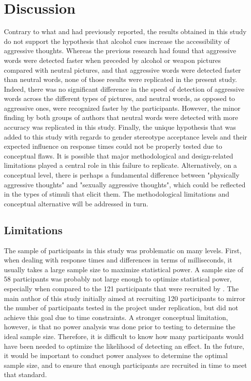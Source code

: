 \documentclass[serif, authordate, twocolumn, empirical]{jote-article}
\begin{document}
{}
\section*{Discussion} %
\label{sec:discussion}

Contrary to what \textcite{BartholowHeinz2006} and \textcite{SubraMullerBegueLBushmanDelmas2010} had previously reported, the results obtained in this study do not support the hypothesis that alcohol cues increase the accessibility of aggressive thoughts. Whereas the previous research had found that aggressive words were detected faster when preceded by alcohol or weapon pictures compared with neutral pictures, and that aggressive words were detected faster than neutral words, none of those results were replicated in the present study. Indeed, there was no significant difference in the speed of detection of aggressive words across the different types of pictures, and neutral words, as opposed to aggressive ones, were recognized faster by the participants. However, the minor finding by both groups of authors that neutral words were detected with more accuracy was replicated in this study. Finally, the unique hypothesis that was added to this study with regards to gender stereotype acceptance levels and their expected influence on response times could not be properly tested due to conceptual flaws. It is possible that major methodological and design-related limitations played a central role in this failure to replicate. Alternatively, on a conceptual level, there is perhaps a fundamental difference between "physically aggressive thoughts"  and "sexually aggressive thoughts", which could be reflected in the types of stimuli that elicit them. The methodological limitations and conceptual alternative will be addressed in turn. 

{}
\subsection*{Limitations}
The sample of participants in this study was problematic on many levels. First, when dealing with response times and differences in terms of milliseconds, it usually takes a large sample size to maximize statistical power. A sample size of 58 participants was probably not large enough to optimize statistical power, especially when compared to the 121 participants that were recruited by \textcite{BartholowHeinz2006}. The main author of this study initially aimed at recruiting 120 participants to mirror the number of participants tested in the project under replication, but did not achieve this goal due to time constraints. A stronger conceptual limitation, however, is that no power analysis was done prior to testing to determine the ideal sample size. Therefore, it is difficult to know how many participants would have been needed to optimize the likelihood of detecting an effect. In the future, it would be important to conduct power analyses to determine the optimal sample size, and to ensure that enough participants are recruited in time to meet that standard. 
\end{document}
